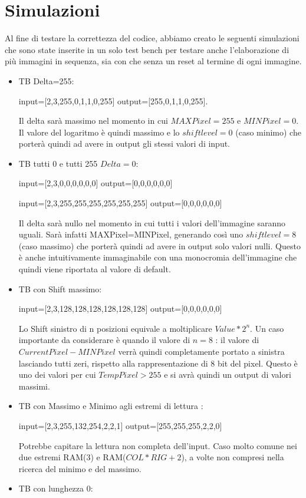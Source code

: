 \documentclass{article}
\begin{document}
\section{Simulazioni}
\label{main-text}
Al fine di testare la correttezza del codice, abbiamo creato le seguenti simulazioni che sono state inserite in un solo test bench per testare anche l'elaborazione di più immagini in sequenza, sia con che senza un reset al termine di ogni immagine.
\begin{itemize}
\item TB Delta=255:

 input=[2,3,255,0,1,1,0,255]
 output=[255,0,1,1,0,255].    
    
   Il delta sarà massimo nel momento in cui \(MAXPixel = 255\) e \(MINPixel = 0\). Il valore del logaritmo è quindi massimo e lo \(shiftlevel=0\) (caso minimo) che porterà quindi ad avere in output gli stessi valori di input.
\item TB tutti 0 e tutti 255 \(Delta=0\):

 input=[2,3,0,0,0,0,0,0] 
 output=[0,0,0,0,0,0]
 
  input=[2,3,255,255,255,255,255,255] 
 output=[0,0,0,0,0,0]
 
 Il delta sarà nullo nel momento in cui tutti i valori dell'immagine saranno uguali. Sarà infatti MAXPixel=MINPixel, generando così uno \(shiftlevel=8\) (caso massimo) che porterà quindi ad avere in output solo valori nulli. Questo è anche intuitivamente immaginabile con una monocromia dell'immagine che quindi viene riportata al valore di default.
 \item TB con Shift massimo:
 
 input=[2,3,128,128,128,128,128,128] 
 output=[0,0,0,0,0,0]

Lo Shift sinistro di n posizioni equivale a moltiplicare \(Value*2^{n}\). Un caso importante da considerare è quando il valore di \(n=8\) : il valore di \(Current Pixel-MINPixel\) verrà quindi completamente portato a sinistra lasciando tutti zeri, rispetto alla rappresentazione di 8 bit del pixel. Questo è uno dei valori per cui \(Temp Pixel>255\) e si avrà quindi un output di valori massimi.
\item TB con Massimo e Minimo agli estremi di lettura : 
 
 input=[2,3,255,132,254,2,2,1] 
 output=[255,255,255,2,2,0]
 
 Potrebbe capitare la lettura non completa dell'input. Caso molto comune nei due estremi RAM(3) e RAM(\(COL*RIG+2\)), a volte non compresi nella ricerca del minimo e del massimo.
 \item TB con lunghezza 0:


\end{itemize}
\end{document}
